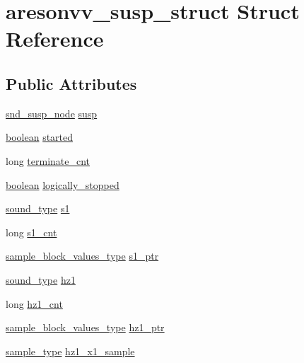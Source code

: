 \hypertarget{structaresonvv__susp__struct}{}\section{aresonvv\+\_\+susp\+\_\+struct Struct Reference}
\label{structaresonvv__susp__struct}
\subsection*{Public Attributes}
\begin{DoxyCompactItemize}
\item 
\hyperlink{sound_8h_a6b268203688a934bd798ceb55f85d4c0}{snd\+\_\+susp\+\_\+node} \hyperlink{structaresonvv__susp__struct_a59ab09afe3bae0a5b998134e2c15576f}{susp}
\item 
\hyperlink{cext_8h_a7670a4e8a07d9ebb00411948b0bbf86d}{boolean} \hyperlink{structaresonvv__susp__struct_aafdeffeb4386f88c1624c483fc88dc88}{started}
\item 
long \hyperlink{structaresonvv__susp__struct_aa592c64d1525d64122ed1f43f4b3ee32}{terminate\+\_\+cnt}
\item 
\hyperlink{cext_8h_a7670a4e8a07d9ebb00411948b0bbf86d}{boolean} \hyperlink{structaresonvv__susp__struct_ae26f1bc1c135f28c072e6e6c8e15ebfa}{logically\+\_\+stopped}
\item 
\hyperlink{sound_8h_a792cec4ed9d6d636d342d9365ba265ea}{sound\+\_\+type} \hyperlink{structaresonvv__susp__struct_a871d728d5531f7bcb5589ecba484cbbb}{s1}
\item 
long \hyperlink{structaresonvv__susp__struct_a6424dc7e059eed0ff34d0a0ad94f1f27}{s1\+\_\+cnt}
\item 
\hyperlink{sound_8h_a83d17f7b465d1591f27cd28fc5eb8a03}{sample\+\_\+block\+\_\+values\+\_\+type} \hyperlink{structaresonvv__susp__struct_a6eedb0b5950ff7e3b4b901af054de6f8}{s1\+\_\+ptr}
\item 
\hyperlink{sound_8h_a792cec4ed9d6d636d342d9365ba265ea}{sound\+\_\+type} \hyperlink{structaresonvv__susp__struct_aa1ea5da9fdeb2d880de024445d405107}{hz1}
\item 
long \hyperlink{structaresonvv__susp__struct_ab1fb22f923fce43e76e8aaed0ae1b8f0}{hz1\+\_\+cnt}
\item 
\hyperlink{sound_8h_a83d17f7b465d1591f27cd28fc5eb8a03}{sample\+\_\+block\+\_\+values\+\_\+type} \hyperlink{structaresonvv__susp__struct_afd7be08dd6faeae4631eee0d40bc25d0}{hz1\+\_\+ptr}
\item 
\hyperlink{sound_8h_a3a9d1d4a1c153390d2401a6e9f71b32c}{sample\+\_\+type} \hyperlink{structaresonvv__susp__struct_add0eee95d1a341517dfb0f3ebc82009c}{hz1\+\_\+x1\+\_\+sample}

\end{DoxyCompactItemize}
